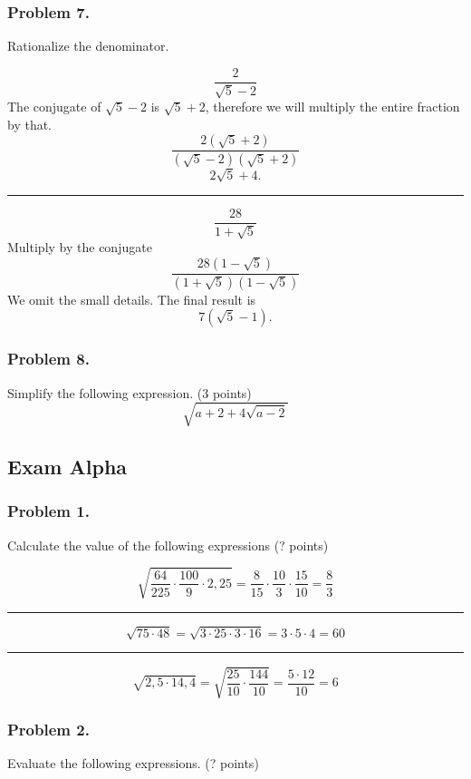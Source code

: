 \documentclass{article}
\begin{document}
\subsubsection{Problem 7.}
Rationalize the denominator.

\[
\frac{2}{\sqrt{5}-2}
\]
The conjugate of $\sqrt{5}-2$ is $\sqrt{5} + 2$, therefore we will multiply the entire fraction by that.
\[
\frac{2(\sqrt{5} + 2)}{(\sqrt{5}-2)(\sqrt{5} + 2)}
\]
\[
2\sqrt{5} + 4.
\]

\vspace{3pt}
\hrule
\vspace{8pt}

\[
\frac{28}{1+\sqrt{5}}
\]
Multiply by the conjugate
\[
\frac{28(1-\sqrt{5})}{(1+\sqrt{5})(1-\sqrt{5})}
\]
We omit the small details. The final result is
\[
7(\sqrt{5} - 1).
\]

\subsubsection{Problem 8.}
Simplify the following expression. (3 points)
\[
\sqrt{a + 2 + 4\sqrt{a-2}}
\]

\subsection{Exam Alpha}
\subsubsection{Problem 1.}

Calculate the value of the following expressions (? points)

\[
\sqrt{\frac{64}{225} \cdot \frac{100}{9} \cdot 2,25} = \frac{8}{15} \cdot \frac{10}{3} \cdot \frac{15}{10} = \frac{8}{3}
\]

\vspace{3pt}
\hrule
\vspace{8pt}

\[
\sqrt{75 \cdot 48} = \sqrt{3 \cdot 25 \cdot 3 \cdot 16} = 3 \cdot 5 \cdot 4 = 60
\]

\vspace{3pt}
\hrule
\vspace{8pt}

\[
\sqrt{2,5 \cdot 14,4} = \sqrt{\frac{25}{10} \cdot \frac{144}{10}} = \frac{5 \cdot 12}{10} = 6
\]

\subsubsection{Problem 2.}
Evaluate the following expressions. (? points)
\end{document}
